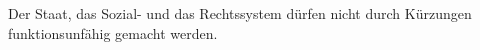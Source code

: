 Der Staat, das Sozial- und das Rechtssystem dürfen nicht durch Kürzungen funktionsunfähig gemacht werden.